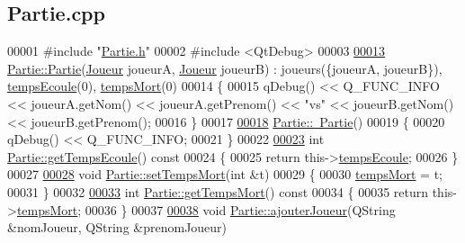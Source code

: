 \hypertarget{_partie_8cpp_source}{}\subsection{Partie.\+cpp}

\begin{DoxyCode}
00001 \textcolor{preprocessor}{#include "\hyperlink{_partie_8h}{Partie.h}"}
00002 \textcolor{preprocessor}{#include <QtDebug>}
00003 
\hyperlink{class_partie_ae1a2da8080f9f51bdd7e9d864080444c}{00013} \hyperlink{class_partie_ae1a2da8080f9f51bdd7e9d864080444c}{Partie::Partie}(\hyperlink{class_joueur}{Joueur} joueurA, \hyperlink{class_joueur}{Joueur} joueurB) : joueurs(\{joueurA, joueurB\}), 
      \hyperlink{class_partie_a58664212ddb4954a59298f1de8256477}{tempsEcoule}(0), \hyperlink{class_partie_a55a5e6e0b757d74fa9aceefa7228ead9}{tempsMort}(0)
00014 \{
00015     qDebug() << Q\_FUNC\_INFO << joueurA.getNom() << joueurA.getPrenom() << \textcolor{stringliteral}{"vs"} << joueurB.getNom() << 
      joueurB.getPrenom();
00016 \}
00017 
\hyperlink{class_partie_ae4afeb7336bb84427272cfb7018b5e3d}{00018} \hyperlink{class_partie_ae4afeb7336bb84427272cfb7018b5e3d}{Partie::~Partie}()
00019 \{
00020     qDebug() << Q\_FUNC\_INFO;
00021 \}
00022 
\hyperlink{class_partie_ab5bb77bcbdb9a145016ebb4ff2bf6c38}{00023} \textcolor{keywordtype}{int} \hyperlink{class_partie_ab5bb77bcbdb9a145016ebb4ff2bf6c38}{Partie::getTempsEcoule}()\textcolor{keyword}{ const}
00024 \textcolor{keyword}{}\{
00025     \textcolor{keywordflow}{return} this->\hyperlink{class_partie_a58664212ddb4954a59298f1de8256477}{tempsEcoule};
00026 \}
00027 
\hyperlink{class_partie_a4c9c799ba4057c15c0600bdf8b7f296f}{00028} \textcolor{keywordtype}{void} \hyperlink{class_partie_a4c9c799ba4057c15c0600bdf8b7f296f}{Partie::setTempsMort}(\textcolor{keywordtype}{int} &t)
00029 \{
00030     \hyperlink{class_partie_a55a5e6e0b757d74fa9aceefa7228ead9}{tempsMort} = t;
00031 \}
00032 
\hyperlink{class_partie_ad78c6daffd7a676ce6c0a8e511991a75}{00033} \textcolor{keywordtype}{int} \hyperlink{class_partie_ad78c6daffd7a676ce6c0a8e511991a75}{Partie::getTempsMort}()\textcolor{keyword}{ const}
00034 \textcolor{keyword}{}\{
00035     \textcolor{keywordflow}{return} this->\hyperlink{class_partie_a55a5e6e0b757d74fa9aceefa7228ead9}{tempsMort};
00036 \}
00037 
\hyperlink{class_partie_ab9900d3b66d9ac7eabc837c790faa6b8}{00038} \textcolor{keywordtype}{void} \hyperlink{class_partie_ab9900d3b66d9ac7eabc837c790faa6b8}{Partie::ajouterJoueur}(QString &nomJoueur, QString &prenomJoueur)

\end{DoxyCode}
